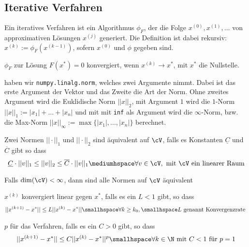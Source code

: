 
\subsection{Iterative Verfahren}
\inlinedef Ein iteratives Verfahren ist ein Algorithmus $\phi_F$, der die Folge $x^{(0)}, x^{(1)}, \ldots$ von approximativen Lösungen $x^{(j)}$ generiert.
Die Definition ist dabei rekursiv: $x^{(k)} := \phi_F(x^{(k - 1)})$, sofern $x^{(0)}$ und $\phi$ gegeben sind.

 $\phi_F$ zur Lösung $F(x^*) = 0$ konvergiert, wenn $x^{(k)} \rightarrow x^*$, mit $x^*$ die Nullstelle.


\innumpy haben wir \texttt{numpy.linalg.norm}, welches zwei Argumente nimmt. Dabei ist das erste Argument der Vektor und das Zweite die Art der Norm.
Ohne zweites Argument wird die Euklidische Norm $||x||_2$, mit Argument $1$ wird die $1$-Norm $||x||_1 := |x_1| + \ldots + |x_n|$
und mit mit \texttt{inf} als Argument wird die $\infty$-Norm, bzw. die Max-Norm $||x||_\infty := \max\{ |x_1|, \ldots, |x_n| \}$ berechnet.

\inlinedef Zwei Normen $||\cdot||_1$ und $||\cdot||_2$ sind äquivalent auf $\cV$, falls es Konstanten $\underline{C}$ und $\overline{C}$ gibt so dass
\rmvspace
\begin{align*}
    \underline{C} \cdot ||v||_1 \leq ||v||_2 \leq \overline{C} \cdot ||v||_1 \mediumhspace \forall v \in \cV, \text{ mit } \cV \text{ ein linearer Raum}
\end{align*}

\drmvspace
\inlinetheorem Falls $\dim(\cV) < \infty$, dann sind alle Normen auf $\cV$ äquivalent

 $x^{(k)}$ konvergiert linear gegen $x^*$, falls es ein $L < 1$ gibt, so dass
\rmvspace
\begin{align*}
    ||x^{(k + 1)} - x^*|| \leq L||x^{(k)} - x^*|| \smallhspace \forall k \geq k_0, \smallhspace L \text{ genannt Konvergenzrate }
\end{align*}

\drmvspace{}
 $p$ für das Verfahren, falls es ein $C > 0$ gibt, so dass
\rmvspace
\begin{align*}
    ||x^{(k + 1)} - x^*|| \leq C||x^{(k)} - x^*||^p \smallhspace \forall k \in \N \text{ mit } C < 1 \text{ für } p = 1
\end{align*}

